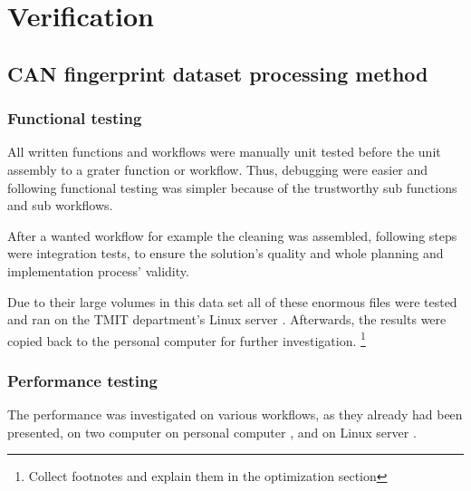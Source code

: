 \chapter{Verification}
\section{CAN fingerprint dataset processing method}
\subsection{Functional testing}
All written functions and workflows were manually unit tested before the unit assembly to a grater function or workflow. Thus, debugging were easier and following functional testing was simpler because of the trustworthy sub functions and sub workflows.

After a wanted workflow for example the cleaning was assembled, following steps were integration tests, to ensure the solution's quality and whole planning and implementation process' validity.

Due to their large volumes in this data set all of these enormous files were tested and ran on the TMIT department's Linux server \cite{Batman}.
Afterwards, the results were copied back to the personal computer for further investigation.
\footnote{Collect footnotes and explain them in the optimization section}
\subsection{Performance testing}
The performance was investigated on various workflows, as they already had been presented, on two computer on personal computer \cite{Latitude}, and on Linux server \cite{Batman}.

